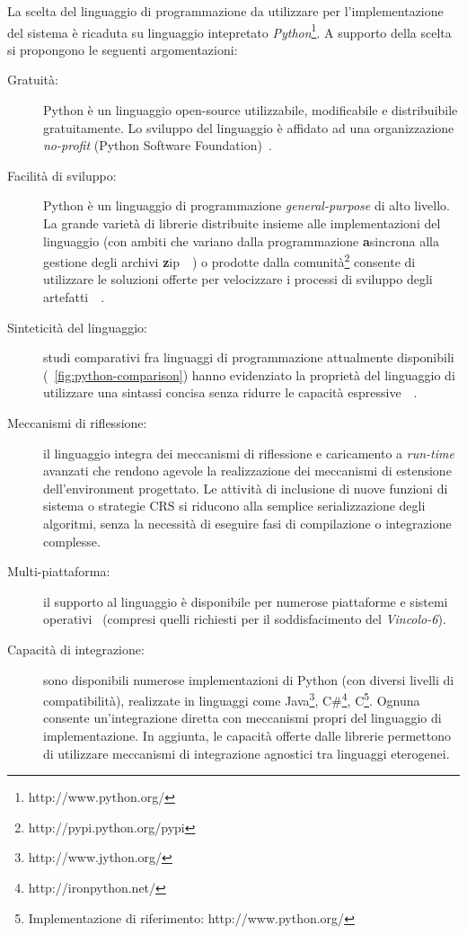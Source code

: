 La scelta del linguaggio di programmazione da utilizzare per l'implementazione del sistema è ricaduta su linguaggio intepretato \emph{Python}\footnote{http://www.python.org/}. A supporto della scelta si propongono le seguenti argomentazioni:
\begin{description}
	\item[Gratuità:] Python è un linguaggio open-source utilizzabile, modificabile e distribuibile gratuitamente. Lo sviluppo del linguaggio è affidato ad una organizzazione \emph{no-profit} (Python Software Foundation)~\cite{pythonfaq}.
	
	\item[Facilità di sviluppo:] Python è un linguaggio di programmazione \emph{general-purpose} di alto livello. La grande varietà di librerie distribuite insieme alle implementazioni del linguaggio (con ambiti che variano dalla programmazione \textbf{a}sincrona alla gestione degli archivi \textbf{z}ip~\cite{pythonfaq}~\cite{pythonstdlib}) o prodotte dalla comunità\footnote{http://pypi.python.org/pypi} consente di utilizzare le soluzioni offerte per velocizzare i processi di sviluppo degli artefatti~\cite{prechelt2000}~\cite{prashant2008}.
	
	\item[Sinteticità del linguaggio:] studi comparativi fra linguaggi di programmazione attualmente disponibili (\figurename~\ref{fig:python-comparison}) hanno evidenziato la proprietà del linguaggio di utilizzare una sintassi concisa senza ridurre le capacità espressive~\cite{prechelt2000}~\cite{prashant2008}.
	
	\item[Meccanismi di riflessione:] il linguaggio integra dei meccanismi di riflessione e caricamento a \emph{run-time} avanzati che rendono agevole la realizzazione dei meccanismi di estensione dell'environment progettato. Le attività di inclusione di nuove funzioni di sistema o strategie CRS si riducono alla semplice serializzazione degli algoritmi, senza la necessità di eseguire fasi di compilazione o integrazione complesse.
	
	\item[Multi-piattaforma:] il supporto al linguaggio è disponibile per numerose piattaforme e sistemi operativi~\cite{pythonfaq} (compresi quelli richiesti per il  soddisfacimento del \emph{Vincolo-6}).
	
	\item[Capacità di integrazione:] sono disponibili numerose implementazioni di Python (con diversi livelli di compatibilità), realizzate in linguaggi come  Java\footnote{http://www.jython.org/}, C\#\footnote{http://ironpython.net/}, C\footnote{Implementazione di riferimento: http://www.python.org/}. Ognuna consente un'integrazione diretta con meccanismi propri del linguaggio di implementazione. In aggiunta, le capacità offerte dalle librerie permettono di utilizzare meccanismi di integrazione agnostici tra linguaggi eterogenei.
\end{description}

